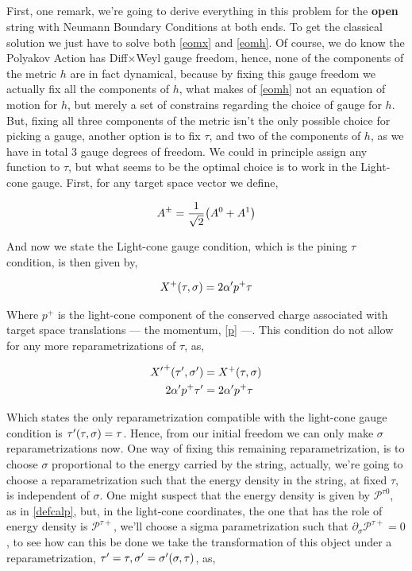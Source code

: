 \problem{}
\subsection{}

First, one remark, we're going to derive everything in this problem for the \textbf{open} string with 
Neumann Boundary Conditions at both ends. To get the classical solution we just have to solve both
\ref{eomx} and \ref{eomh}. Of course, we do know the Polyakov Action has  Diff$\times$Weyl gauge freedom, hence, 
none of the components of the metric $h$ are in fact dynamical, because by fixing this gauge freedom we actually 
fix all the components of $h$, what makes of \ref{eomh} not an equation of motion for $h$, but merely a set of 
constrains regarding the choice of gauge for $h$. But, fixing all three components of the metric isn't the 
only possible choice for picking a gauge, another option is to fix $\tau$, and two of the components 
of $h$, as we have in total 3 gauge degrees of freedom. We could in principle assign any function to $\tau$, but 
what seems to be the optimal choice is to work in the Light-cone gauge. First, for any target space vector we define,

\begin{align*}
    A^\pm=\frac{1}{\sqrt2}\qty(A^0+A^1)
\end{align*}

And now we state the Light-cone gauge condition, which is the pining $\tau$ condition, is then given by,

\begin{align*}
    X^+\qty(\tau,\sigma)=2\alpha'p^+\tau
\end{align*}

Where $p^+$ is the light-cone component of the conserved charge associated with target space translations --- the momentum, \ref{p} ---. This 
condition do not allow for any more reparametrizations of $\tau$, as,

\begin{align*}
    {X'}^+\qty(\tau',\sigma')&=X^+\qty(\tau,\sigma)\\
    2\alpha'p^+\tau'&=2\alpha'p^+\tau
\end{align*}

Which states the only reparametrization compatible with the light-cone gauge condition is $\tau'\qty(\tau,\sigma)=\tau$. Hence, from our 
initial freedom we can only make $\sigma$ reparametrizations now. One way of fixing this remaining reparametrization, is to choose $\sigma$ proportional 
to the energy carried by the string, actually, we're going to choose a reparametrization such that the energy density in the string, at fixed $\tau$, is independent of 
$\sigma$. One might suspect that the energy density is given by $\mathcal P^{\tau0}$, as in \ref{defcalp}, but, in the light-cone coordinates, the one that has 
the role of energy density is $\mathcal P^{\tau+}$, we'll choose a sigma parametrization such that $\partial_\sigma\mathcal P^{\tau+}=0$, to see how can this 
be done we take the transformation of this object under a reparametrization, $\tau'=\tau,\sigma'=\sigma'\qty(\sigma,\tau)$, as,

